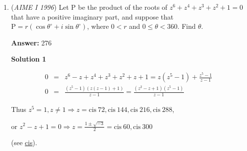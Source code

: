 \begin{enumerate}
Notice that $\sin 45^\circ = \cos 45^\circ$. Therefore, all terms in the numerator and the denominator could be multiplied by either $\sin 45^\circ$ or $\cos 45^\circ$.
 \begin{align*}     \frac{\cos 96^\circ + \sin 96^\circ}{\cos 96^\circ - \sin 96^\circ}     &= \frac{\cos 96^\circ \sin 45^\circ + \sin 96^\circ \cos 45^\circ}{\cos 96^\circ \cos 45^\circ - \sin 96^\circ \sin 45^\circ} \\[0.5em]     &= \frac{\sin(96 + 45)^\circ}{\cos(96 + 45)^\circ} \\[0.5em]     &= \tan 141^\circ \end{align*}
Therefore, $\tan19x^\circ = \tan 141^\circ$. In other words, $19x = 141 + 180k$ for some integer $k$.
 \begin{align*}     141 + 180k &\equiv 0 \pmod{19} \\     8 + 9k &\equiv 0 \pmod{19} \\     9k &\equiv 11 \pmod{19} \\     9k &\equiv 11, 30, 49, 68, 87, 106, 125, 144 \pmod{19} \\ \end{align*}
Substituting $k$, the smallest value of $19x$ is $141 + 180 \cdot 16$, which is $\boxed{159}$.

 


	\item (\textit{AIME I 1996}) Let $\mathrm {P}$ be the product of the roots of $z^6+z^4+z^3+z^2+1=0$ that have a positive imaginary part, and suppose that $\mathrm {P}=r(\cos{\theta^{\circ}}+i\sin{\theta^{\circ}})$, where $0<r$ and $0\leq \theta <360$. Find $\theta$.


 
 \textbf{Answer: }276



\textbf{Solution 1}


 \begin{eqnarray*} 0 &=& z^6 - z + z^4 + z^3 + z^2 + z + 1 = z(z^5 - 1) + \frac{z^5-1}{z-1}\\ 0 &=& \frac{(z^5 - 1)(z(z-1)+1)}{z-1} = \frac{(z^2-z+1)(z^5-1)}{z-1} \end{eqnarray*}

 
Thus $z^5 = 1, z \neq 1 \Longrightarrow z = \mathrm{cis}\ 72, \mathrm{cis}\ 144, \mathrm{cis}\ 216, \mathrm{cis}\ 288$,

 or $z^2 - z + 1 = 0 \Longrightarrow z = \frac{1 \pm \sqrt{-3}}{2} = \mathrm{cis}\ 60, \mathrm{cis}\ 300$ 

 (see \href{https://artofproblemsolving.com/wiki/index.php?title=Cis}{cis}).


\end{enumerate}

